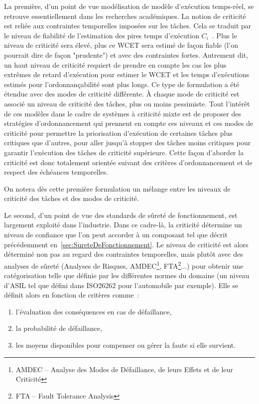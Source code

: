 \documentclass[french, a4paper, 11pt, twoside, pdftex]{StyleThese}
\begin{document}
    La première, d'un point de vue modélisation de modèle d'exécution temps-réel, se retrouve essentiellement dans les recherches académiques. La notion de criticité est reliée aux contraintes temporelles imposées sur les tâches. Cela se traduit par le niveau de fiabilité de l'estimation des pires temps d'exécution $C_i$~\cite{vestal_preemptive_2007}. 
    Plus le niveau de criticité sera élevé, plus ce WCET sera estimé de façon fiable (l'on pourrait dire de façon "prudente") et avec des contraintes fortes. Autrement dit, un haut niveau de criticité requiert de prendre en compte les cas les plus extrêmes de retard d'exécution pour estimer le WCET et les temps d'exécutions estimés pour l'ordonnançabilité sont plus longs. Ce type de formulation a été étendue avec des modes de criticité différente. À chaque mode de criticité est associé un niveau de criticité des tâches, plus ou moins pessimiste.
    Tout l'intérêt de ces modèles  dans le cadre de systèmes à criticité mixte est de proposer des stratégies d'ordonnancement qui prennent en compte ces niveaux et ces modes de criticité pour permettre la priorisation d'exécution de certaines tâches plus critiques que d'autres, pour aller jusqu'à stopper des tâches moins critiques pour garantir l'exécution des tâches de criticité supérieure. Cette façon d'aborder la criticité est donc totalement orientée suivant des critères d'ordonnancement et de respect des échéances temporelles.
    
    On notera dès cette première formulation un mélange entre les niveaux de criticité des tâches et des modes de criticité. 

    Le second, d'un point de vue des standards de sûreté de fonctionnement, est largement exploité dans l'industrie. Dans ce cadre-là, la criticité détermine un niveau de confiance que l'on peut accorder à un composant tel que décrit précédemment en~\autoref{sec:SureteDeFonctionnement}. Le niveau de criticité est alors déterminé non pas au regard des contraintes temporelles, mais plutôt avec des analyses de sûreté (Analyses de Risques, AMDEC\footnote{AMDEC -- Analyse des Modes de Défaillance, de leurs Effets et de leur Criticité}, FTA\footnote{FTA -- Fault Tolerance Analysis}...) pour obtenir une catégorisation telle que définie par les différentes normes du domaine (un niveau d'ASIL tel que défini dans ISO26262 pour l'automobile par exemple). Elle se définit alors en fonction de critères comme~: 
\begin{enumerate}[label=\textbf{\alph*)}]
	\item     l'évaluation des conséquences en cas de défaillance, 
	\item     la probabilité de défaillance, 
	\item     les moyens disponibles pour compenser ou gérer la faute si elle survient.
\end{enumerate}
\end{document}
